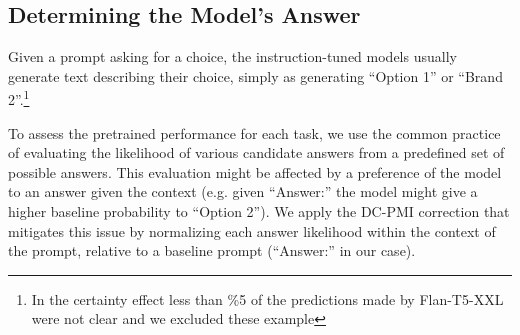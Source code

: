 


\subsection{Determining the Model's Answer}
\label{subsec:eval_ans}
Given a prompt asking for a choice, the instruction-tuned models usually generate text describing their choice, simply as generating ``Option 1'' or ``Brand 2''.\footnote{In the certainty effect less than \%5 of the predictions made by Flan-T5-XXL were not clear and we excluded these example}

To assess the pretrained performance for each task, we use the common practice \cite{brown2020language} of evaluating the likelihood of various candidate answers from a predefined set of possible answers. 
This evaluation might be affected by a preference of the model to an answer given the context (e.g. given ``Answer:'' the model might give a higher baseline probability to ``Option 2'').
We apply the DC-PMI correction \cite{holtzman-etal-2021-surface} that mitigates this issue by normalizing each answer likelihood within the context of the prompt, relative to a baseline prompt (``Answer:'' in our case).

